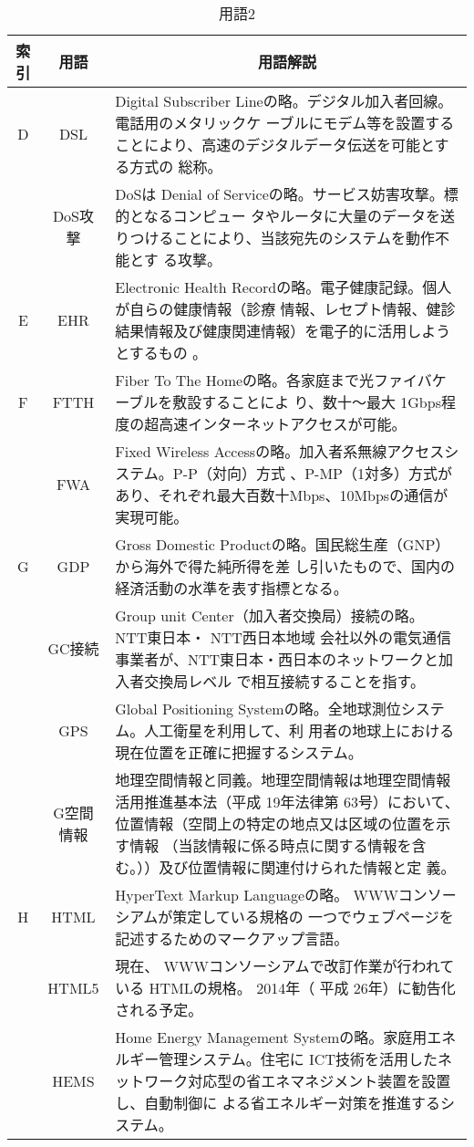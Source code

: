 \begin{table}[htb]
  \begin{center}
    \caption{用語2}
    \begin{tabular}{|c|c|p{12cm}|}
      \hline
      索引 & 用語 & \multicolumn{1}{c|}{用語解説} \\
      \hline
      D & DSL & Digital Subscriber Lineの略。デジタル加入者回線。電話用のメタリックケ
      ーブルにモデム等を設置することにより、高速のデジタルデータ伝送を可能とする方式の
      総称。\\
      \cline{2-3}
      & DoS攻撃 & DoSは Denial of Serviceの略。サービス妨害攻撃。標的となるコンピュー
      タやルータに大量のデータを送りつけることにより、当該宛先のシステムを動作不能とす
      る攻撃。\\
      \hline
      E & EHR & Electronic Health Recordの略。電子健康記録。個人が自らの健康情報（診療
        情報、レセプト情報、健診結果情報及び健康関連情報）を電子的に活用しようとするもの
      。\\
      \hline
      F & FTTH & Fiber To The Homeの略。各家庭まで光ファイバケーブルを敷設することによ
      り、数十〜最大 1Gbps程度の超高速インターネットアクセスが可能。\\
      \cline{2-3}
      & FWA & Fixed Wireless Accessの略。加入者系無線アクセスシステム。P-P（対向）方式
      、P-MP（1対多）方式があり、それぞれ最大百数十Mbps、10Mbpsの通信が実現可能。\\
      \hline
      G & GDP & Gross Domestic Productの略。国民総生産（GNP）から海外で得た純所得を差
      し引いたもので、国内の経済活動の水準を表す指標となる。\\
      \cline{2-3}
      & GC接続 & Group unit Center（加入者交換局）接続の略。 NTT東日本・ NTT西日本地域
      会社以外の電気通信事業者が、NTT東日本・西日本のネットワークと加入者交換局レベル
      で相互接続することを指す。\\
      \cline{2-3}
      & GPS& Global Positioning Systemの略。全地球測位システム。人工衛星を利用して、利
      用者の地球上における現在位置を正確に把握するシステム。 \\
      \cline{2-3}
      & G空間情報 & 地理空間情報と同義。地理空間情報は地理空間情報活用推進基本法（平成
        19年法律第 63号）において、位置情報（空間上の特定の地点又は区域の位置を示す情報
        （当該情報に係る時点に関する情報を含む。））及び位置情報に関連付けられた情報と定
      義。 \\
      \hline
      H & HTML & HyperText Markup Languageの略。 WWWコンソーシアムが策定している規格の
      一つでウェブページを記述するためのマークアップ言語。 \\
      \cline{2-3}
      & HTML5 & 現在、 WWWコンソーシアムで改訂作業が行われている HTMLの規格。 2014年（
        平成 26年）に勧告化される予定。 \\
      \cline{2-3}
      & HEMS & Home Energy Management Systemの略。家庭用エネルギー管理システム。住宅に
      ICT技術を活用したネットワーク対応型の省エネマネジメント装置を設置し、自動制御に
      よる省エネルギー対策を推進するシステム。 \\
      \hline
    \end{tabular}
  \end{center}
\end{table}

